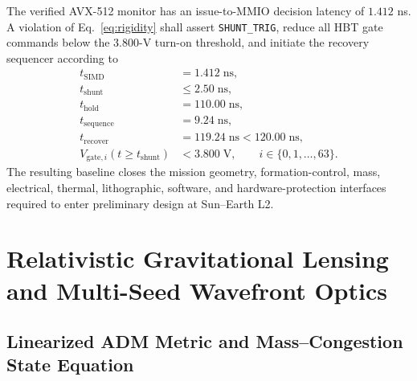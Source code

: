 \documentclass[10pt,twocolumn]{IEEEtran}
\begin{document}
The verified AVX-512 monitor has an issue-to-MMIO decision latency of $1.412$ ns. A violation of Eq.~\eqref{eq:rigidity} shall assert \texttt{SHUNT\_TRIG}, reduce all HBT gate commands below the $3.800$-V turn-on threshold, and initiate the recovery sequencer according to
\begin{equation}
\begin{aligned}
t_{\mathrm{SIMD}} &=1.412\;\mathrm{ns}, \\
t_{\mathrm{shunt}} &\leq 2.50\;\mathrm{ns}, \\
t_{\mathrm{hold}} &=110.00\;\mathrm{ns}, \\
t_{\mathrm{sequence}} &=9.24\;\mathrm{ns}, \\
t_{\mathrm{recover}} &=119.24\;\mathrm{ns}<120.00\;\mathrm{ns}, \\
V_{\mathrm{gate},i}(t\geq t_{\mathrm{shunt}}) &<3.800\;\mathrm{V},
\qquad i\in\{0,1,\ldots,63\}.
\end{aligned}
\label{eq:interlock_timing}
\end{equation}
The resulting baseline closes the mission geometry, formation-control, mass, electrical, thermal, lithographic, software, and hardware-protection interfaces required to enter preliminary design at Sun--Earth L2.

\section{Relativistic Gravitational Lensing and Multi-Seed Wavefront Optics}
\label{sec:relativistic_optics}

\subsection{Linearized ADM Metric and Mass--Congestion State Equation}
\end{document}
